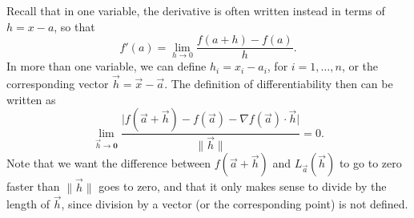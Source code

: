 Recall that in one variable, the derivative is often written instead in terms of $h=x-a$, so that
\[
f'(a) = \lim_{h\to 0}\frac{f(a+h)-f(a)}{h}.
\]
In more than one variable, we can define $h_i = x_i-a_i$, for $i=1,\ldots, n$, or the corresponding vector $\vec{h} = \vec{x}-\vec{a}$. The definition of differentiability then can be written as
\begin{equation}\label{eq_deriv_with_h}
\lim_{\vec{h}\to \mathbf{0}}\frac{\lvert f(\vec{a}+\vec{h})-f(\vec{a})-\nabla f(\vec{a})\cdot\vec{h}\rvert}{\lVert \vec{h}\rVert} = 0.
\end{equation}
Note that we want the difference between $f(\vec{a}+\vec{h})$ and $L_{\vec{a}}(\vec{h})$ to go to zero faster than $\lVert \vec{h}\rVert$ goes to zero, and that it only makes sense to divide by the length of $\vec{h}$, since division by a vector (or the corresponding point) is not defined.

